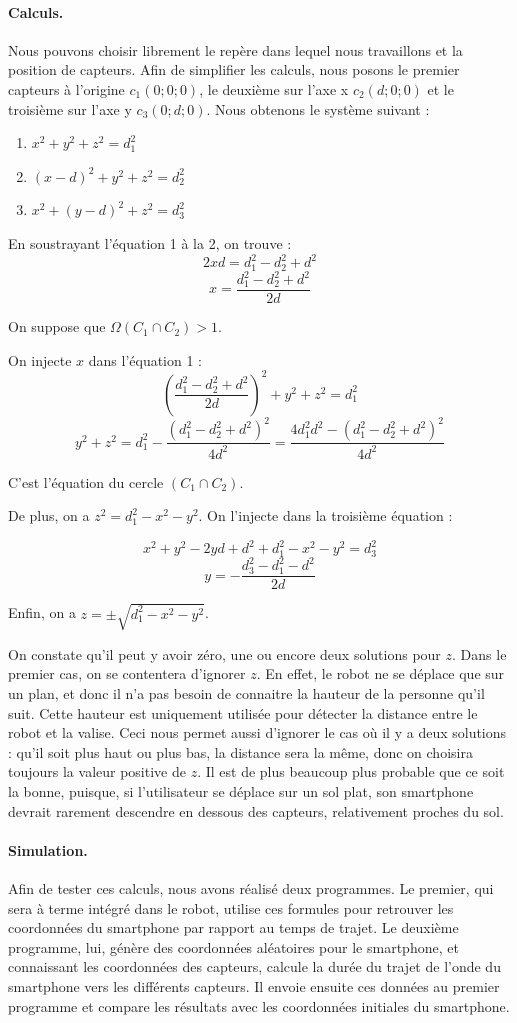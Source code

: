 \paragraph{Calculs.}
Nous pouvons choisir librement le repère dans lequel nous travaillons et la position de capteurs. Afin de simplifier les calculs, nous posons le premier capteurs à l'origine $c_1(0;0;0)$, le deuxième sur l'axe x $c_2(d;0;0)$ et le troisième sur l'axe y $c_3(0;d;0)$. Nous obtenons le système suivant :
\begin{enumerate}
    \item $x^2 + y^2 + z^2 = d_1^2$
    \item $(x-d)^2 + y^2 + z^2 = d_2^2$
    \item $x^2 + (y-d)^2 + z^2 = d_3^2$
\end{enumerate}

En soustrayant l'équation 1 à la 2, on trouve :
\[2xd=d_1^2-d_2^2+d^2\]
\[x = \frac{d_1^2- d_2^2 + d^2}{2d}\]

On suppose que $\Omega(C_1 \cap C_2) > 1$.

On injecte $x$ dans l'équation 1 :
\[ \left(\frac{d_1^2-d_2^2+d^2}{2d}\right)^2 + y^2 + z^2 = d_1^2 \]
\[ y^2 + z^2 = d_1^2 - \frac{(d_1^2 - d_2^2 + d^2)^2}{4d^2} = \frac{4d_1^2d^2 - (d_1^2 - d_2^2 + d^2)^2}{4d^2} \]

C'est l'équation du cercle $(C_1 \cap C_2)$.

De plus, on a $z^2 = d_1^2-x^2-y^2$. On l'injecte dans la troisième équation :

\[ x^2 + y^2 - 2yd + d^2 + d_1^2 - x^2 - y^2 = d_3^2 \]
\[ y = -\frac{d_3^2 - d_1^2 - d^2}{2d} \]

Enfin, on a $z = \pm\sqrt{d_1^2-x^2-y^2}$.

On constate qu'il peut y avoir zéro, une ou encore deux solutions pour $z$. Dans le premier cas, on se contentera d'ignorer $z$. En effet, le robot ne se déplace que sur un plan, et donc il n'a pas besoin de connaitre la hauteur de la personne qu'il suit. Cette hauteur est uniquement utilisée pour détecter la distance entre le robot et la valise. Ceci nous permet aussi d'ignorer le cas où il y a deux solutions : qu'il soit plus haut ou plus bas, la distance sera la même, donc on choisira toujours la valeur positive de $z$. Il est de plus beaucoup plus probable que ce soit la bonne, puisque, si l'utilisateur se déplace sur un sol plat, son smartphone devrait rarement descendre en dessous des capteurs, relativement proches du sol.

\paragraph{Simulation.}
Afin de tester ces calculs, nous avons réalisé deux programmes. Le premier, qui sera à terme intégré dans le robot, utilise ces formules pour retrouver les coordonnées du smartphone par rapport au temps de trajet. Le deuxième programme, lui, génère des coordonnées aléatoires pour le smartphone, et connaissant les coordonnées des capteurs, calcule la durée du trajet de l'onde du smartphone vers les différents capteurs. Il envoie ensuite ces données au premier programme et compare les résultats avec les coordonnées initiales du smartphone.

